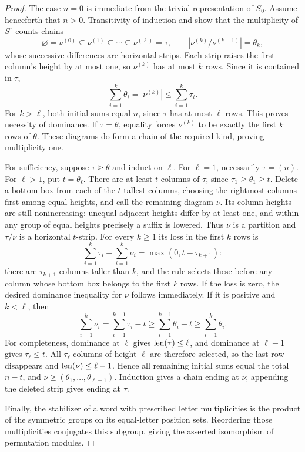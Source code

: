 \begin{proof}
The case $n=0$ is immediate from the trivial representation of $S_0$.
Assume henceforth that $n>0$.
Transitivity of induction and  show that the multiplicity
of $S^\tau$ counts chains
\begin{equation}\label{tools:strip-chain}
 \varnothing=\nu^{(0)}\subseteq\nu^{(1)}\subseteq\cdots
 \subseteq\nu^{(\ell)}=\tau,
 \qquad |\nu^{(k)}/\nu^{(k-1)}|=\theta_k,
\end{equation}
whose successive differences are horizontal strips.
Each strip raises the first column's height by at most one, so
$\nu^{(k)}$ has at most $k$ rows.  Since it is contained in $\tau$,
\[
 \sum_{i=1}^k\theta_i=|\nu^{(k)}|
 \le\sum_{i=1}^k\tau_i.
\]
For $k>\ell$, both initial sums equal $n$, since $\tau$ has at most
$\ell$ rows.  This proves necessity of dominance.
If $\tau=\theta$, equality forces
$\nu^{(k)}$ to be exactly the first $k$ rows of $\theta$.
These diagrams do form a chain of the required kind, proving
multiplicity one.

For sufficiency, suppose $\tau\unrhd\theta$ and induct on $\ell$.
For $\ell=1$, necessarily $\tau=(n)$.
For $\ell>1$, put $t=\theta_\ell$.
There are at least $t$ columns of $\tau$, since
$\tau_1\ge\theta_1\ge t$.  Delete a bottom box from each of the
$t$ tallest columns, choosing the rightmost columns first among equal
heights, and call the remaining diagram $\nu$.
Its column heights are still nonincreasing: unequal adjacent heights
differ by at least one, and within any group of equal heights precisely
a suffix is lowered.  Thus $\nu$ is a partition and $\tau/\nu$ is a
horizontal $t$-strip.  For every $k\ge1$ its loss in the first $k$ rows is
\begin{equation}\label{tools:prefix-loss}
 \sum_{i=1}^k\tau_i-\sum_{i=1}^k\nu_i
       =\max(0,t-\tau_{k+1}):
\end{equation}
there are $\tau_{k+1}$ columns taller than $k$, and the rule selects these
before any column whose bottom box belongs to the first $k$ rows.
If the loss is zero, the desired dominance inequality for $\nu$ follows
immediately.  If it is positive and $k<\ell$, then
\[
 \sum_{i=1}^k\nu_i
 =\sum_{i=1}^{k+1}\tau_i-t
 \ge\sum_{i=1}^{k+1}\theta_i-t
 \ge\sum_{i=1}^k\theta_i.
\]
For completeness, dominance at $\ell$ gives $\operatorname{len}(\tau)\le\ell$,
and dominance at $\ell-1$ gives $\tau_\ell\le t$.
All $\tau_\ell$ columns of height $\ell$ are therefore selected, so
the last row disappears and $\operatorname{len}(\nu)\le\ell-1$.
Hence all remaining initial sums equal the total $n-t$, and
$\nu\unrhd(\theta_1,\ldots,\theta_{\ell-1})$.
Induction gives a chain ending at $\nu$; appending the deleted strip
gives  ending at $\tau$.

Finally, the stabilizer of a word with prescribed letter multiplicities
is the product of the symmetric groups on its equal-letter position
sets.  Reordering those multiplicities conjugates this subgroup, giving
the asserted isomorphism of permutation modules.
\end{proof}

